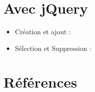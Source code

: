 \hypertarget{avec-jquery}{%
\section{Avec jQuery}\label{avec-jquery}}

\begin{itemize}
\tightlist
\item
  Création et ajout :
\end{itemize}

\begin{english}

\begin{Shaded}
\begin{Highlighting}[]
    \OperatorTok{=} \FunctionTok{$}\NormalTok{(}\NormalTok{)}\OperatorTok{;}  
    \FunctionTok{$}\NormalTok{(}\NormalTok{)}\OperatorTok{;}                
\end{Highlighting}
\end{Shaded}

\end{english}

\begin{itemize}
\tightlist
\item
  Sélection et Suppression :
\end{itemize}

\begin{english}

\begin{Shaded}
\begin{Highlighting}[]
    \OperatorTok{=} \FunctionTok{$}\NormalTok{(}\NormalTok{)}\OperatorTok{;} 
\NormalTok{()}\OperatorTok{;}
\end{Highlighting}
\end{Shaded}

\end{english}

\hypertarget{ruxe9fuxe9rences}{%
\section{Références}\label{ruxe9fuxe9rences}}

